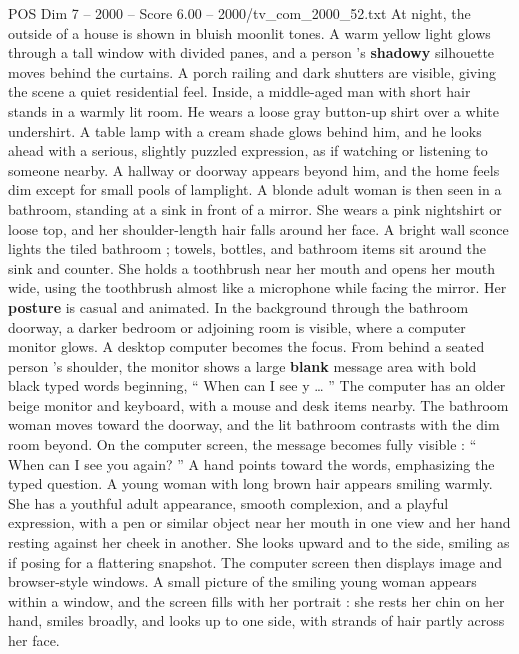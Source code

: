 \begin{textsample}{POS Dim 7 – 2000 – Score 6.00 – 2000/tv\_com\_2000\_52.txt}  \label{ex:f7_pos_076}
At night, the outside of a house is shown in bluish moonlit tones.
A warm yellow light glows through a tall window with divided panes, and a person ’s \textbf{shadowy} silhouette moves behind the curtains.
A porch railing and dark shutters are visible, giving the scene a quiet residential feel.
Inside, a middle-aged man with short hair stands in a warmly lit room.
He wears a loose gray button-up shirt over a white undershirt.
A table lamp with a cream shade glows behind him, and he looks ahead with a serious, slightly puzzled expression, as if watching or listening to someone nearby.
A hallway or doorway appears beyond him, and the home feels dim except for small pools of lamplight.
A blonde adult woman is then seen in a bathroom, standing at a sink in front of a mirror.
She wears a pink nightshirt or loose top, and her shoulder-length hair falls around her face.
A bright wall sconce lights the tiled bathroom ; towels, bottles, and bathroom items sit around the sink and counter.
She holds a toothbrush near her mouth and opens her mouth wide, using the toothbrush almost like a microphone while facing the mirror.
Her \textbf{posture} is casual and animated.
In the background through the bathroom doorway, a darker bedroom or adjoining room is visible, where a computer monitor glows.
A desktop computer becomes the focus.
From behind a seated person ’s shoulder, the monitor shows a large \textbf{blank} message area with bold black typed words beginning, “ When can I see y … ” The computer has an older beige monitor and keyboard, with a mouse and desk items nearby.
The bathroom woman moves toward the doorway, and the lit bathroom contrasts with the dim room beyond.
On the computer screen, the message becomes fully visible : “ When can I see you again? ” A hand points toward the words, emphasizing the typed question.
A young woman with long brown hair appears smiling warmly.
She has a youthful adult appearance, smooth complexion, and a playful expression, with a pen or similar object near her mouth in one view and her hand resting against her cheek in another.
She looks upward and to the side, smiling as if posing for a flattering snapshot.
The computer screen then displays image and browser-style windows.
A small picture of the smiling young woman appears within a window, and the screen fills with her portrait : she rests her chin on her hand, smiles broadly, and looks up to one side, with strands of hair partly across her face.

\end{textsample}
